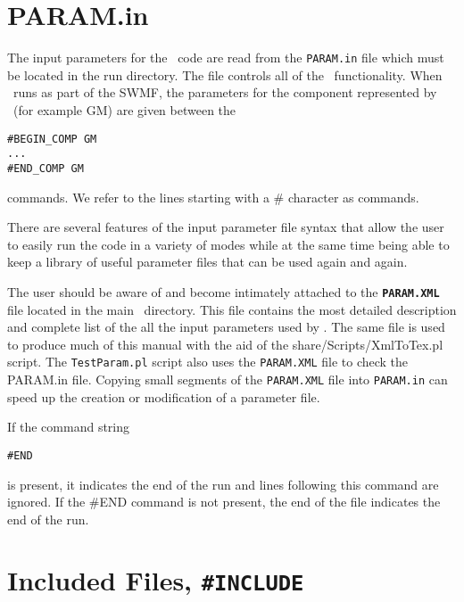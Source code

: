 %

\section{PARAM.in \label{section:param.in}}

The input parameters for the \BATSRUS\ code are read from the 
{\tt PARAM.in} file which must be located in the run directory.
The file controls all of the \BATSRUS\ functionality.
When \BATSRUS\ runs as part of the SWMF, the parameters for 
the component represented by \BATSRUS\ (for example GM) are
given between the 
\begin{verbatim}
#BEGIN_COMP GM
...
#END_COMP GM
\end{verbatim}
commands. We refer to the lines starting with a \# character as commands.

There are several features of the input parameter file syntax
that allow the user to easily run the code
in a variety of modes while at the same time being able to 
keep a library of useful parameter files that can be used
again and again.

The user should be aware of and become intimately attached to the 
{\bf {\tt PARAM.XML}} file located in the main \BATSRUS\ directory.  
This file contains the most detailed 
description and complete list of the all the input parameters
used by \BATSRUS. The same file is used to produce much of this
manual with the aid of the share/Scripts/XmlToTex.pl script. 
The {\tt TestParam.pl} script also uses the {\tt PARAM.XML} file
to check the PARAM.in file.
Copying small segments of the {\tt PARAM.XML} file
into {\tt PARAM.in} can speed up the creation or modification of a 
parameter file. 

If the command string 
\begin{verbatim}
#END
\end{verbatim}
is present, it indicates the end of the run and lines following
this command are ignored. If the \#END command is not
present, the end of the file indicates the end of the run.

\section{Included Files, {\tt \#INCLUDE} \label{section:include}}

